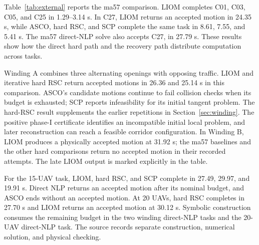 Table~\ref{tab:external} reports the ma57 comparison. LIOM completes C01, C03, C05, and C25 in 1.29--3.14 s. In C27, LIOM returns an accepted motion in 24.35 s, while ASCO, hard RSC, and SCP complete the same task in 8.61, 7.55, and 5.41 s. The ma57 direct-NLP solve also accepts C27, in 27.79 s. These results show how the direct hard path and the recovery path distribute computation across tasks.

Winding A combines three alternating openings with opposing traffic. LIOM and iterative hard RSC return accepted motions in 26.36 and 25.14 s in this comparison. ASCO's candidate motions continue to fail collision checks when its budget is exhausted; SCP reports infeasibility for its initial tangent problem. The hard-RSC result supplements the earlier repetitions in Section~\ref{sec:winding}. The positive phase-I certificate identifies an incompatible initial local problem, and later reconstruction can reach a feasible corridor configuration. In Winding B, LIOM produces a physically accepted motion at 31.92 s; the ma57 baselines and the other hard comparisons return no accepted motion in their recorded attempts. The late LIOM output is marked explicitly in the table.

For the 15-UAV task, LIOM, hard RSC, and SCP complete in 27.49, 29.97, and 19.91 s. Direct NLP returns an accepted motion after its nominal budget, and ASCO ends without an accepted motion. At 20 UAVs, hard RSC completes in 27.70 s and LIOM returns an accepted motion at 30.12 s. Symbolic construction consumes the remaining budget in the two winding direct-NLP tasks and the 20-UAV direct-NLP task. The source records separate construction, numerical solution, and physical checking.

